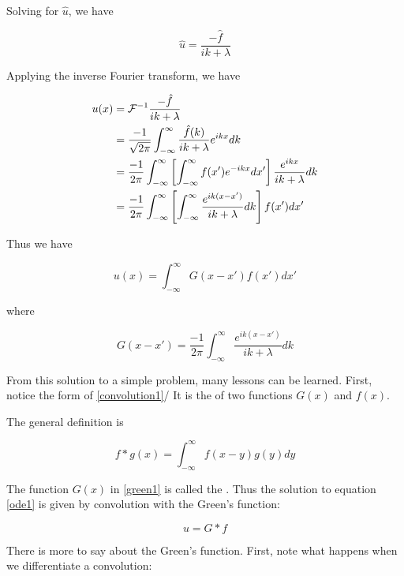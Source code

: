 Solving for $\hat u$, we have

\begin{equation}
\hat u = \frac{-\hat f}{ik + \lambda}
\end{equation}

Applying the inverse Fourier transform, we have

\begin{align}
u(x) &= \mathcal{F}^{-1}\frac{-\hat f}{ik + \lambda} \\
 &= \frac{-1}{\sqrt{2\pi}} \int_{-\infty}^{\infty} \frac{ \hat f(k) }{ik + \lambda}e^{ikx} dk \\
 &= \frac{-1}{2\pi} \int_{-\infty}^{\infty} \left[  \int_{-\infty}^{\infty} f(x')e^{-ikx} dx' \right] \frac{e^{ikx}}{ik + \lambda}dk \\
&=  \frac{-1}{2\pi} \int_{-\infty}^{\infty} \left[  \int_{-\infty}^{\infty} \frac{e^{ik(x-x')}} {ik + \lambda} dk \right] f(x')dx'
\end{align}

Thus we have

\begin{equation}
\label{convolution1}
u(x) = \int_{-\infty}^{\infty} G(x-x') f(x') dx'
\end{equation}

where

\begin{equation}
\label{green1}
G(x-x')  = \frac{-1}{2\pi} \int_{-\infty}^{\infty} \frac{e^{ik(x-x')}} {ik + \lambda}dk
\end{equation}

From this solution to a simple problem, many lessons can be learned.  First, notice the form of  \eqref{convolution1}/  It is the  of two functions $G(x)$ and $f(x)$.

The general definition is

\begin{equation}
f*g(x) = \int_{-\infty}^{\infty} f(x-y)g(y)dy
\end{equation}

The function $G(x)$ in \eqref{green1} is called the .  Thus the solution to equation \eqref{ode1} is given by convolution with the Green's function:

\begin{equation}
u = G*f
\end{equation}

There is more to say about the Green's function.  First, note what happens when we differentiate a convolution:

